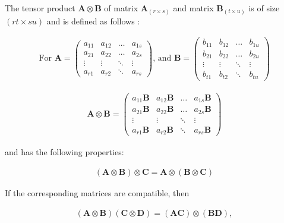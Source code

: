 \begin{definition}

The tensor product $\mathbf{A} \otimes \mathbf{B}$ of matrix $\mathbf{A}_{(r \times s)}$ and matrix $\mathbf{B}_{(t \times u)}$ is of size $(rt \times su)$ and is defined as follows \cite{HalmosLinearAlgebra}:

\begin{align*}
\text{For }
\mathbf{A} = \begin{pmatrix}
    a_{11} & a_{12} & \dots  & a_{1s} \\
    a_{21} & a_{22} & \dots  & a_{2s} \\
    \vdots & \vdots & \ddots & \vdots \\
    a_{r1} & a_{r2} & \ddots & a_{rs}
\end{pmatrix}
\text{, and }
\mathbf{B} = \begin{pmatrix}
    b_{11} & b_{12} & \dots  & b_{1u} \\
    b_{21} & b_{22} & \dots  & b_{2u} \\
    \vdots & \vdots & \ddots & \vdots \\
    b_{t1} & b_{t2} & \ddots & b_{tu}
\end{pmatrix}
\end{align*}

\begin{align*}
\mathbf{A} \otimes \mathbf{B} = \begin{pmatrix}
    a_{11}\mathbf{B} & a_{12}\mathbf{B} & \dots  & a_{1s}\mathbf{B} \\
    a_{21}\mathbf{B} & a_{22}\mathbf{B} & \dots  & a_{2s}\mathbf{B} \\
    \vdots  & \vdots  & \ddots & \vdots  \\
    a_{r1}\mathbf{B} & a_{r2}\mathbf{B} & \ddots & a_{rs}\mathbf{B}
\end{pmatrix}
\end{align*}

\end{definition}

and has the following properties:

\begin{property}[Associativity]
\begin{align*}
  (\mathbf{A} \otimes \mathbf{B}) \otimes \mathbf{C} = \mathbf{A} \otimes (\mathbf{B} \otimes \mathbf{C})
\end{align*}
\end{property}

\begin{property}
\label{TensorMixedProduct}

If the corresponding matrices are compatible, then

\begin{align*}
  (\mathbf{A} \otimes \mathbf{B})(\mathbf{C} \otimes \mathbf{D}) = (\mathbf{A}\mathbf{C}) \otimes (\mathbf{B}\mathbf{D}),
\end{align*}
\end{property}

